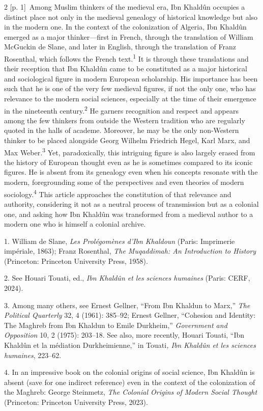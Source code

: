 \documentclass[10pt,a4paper]{article}
\begin{document}
\begin{paracol}{2}
\switchcolumn
{\scriptsize\color{gray} [p. 1]}\ Among Muslim thinkers of the medieval era, Ibn Khaldûn occupies a distinct place not only in the medieval genealogy of historical knowledge but also in the modern one. In the context of the colonization of Algeria, Ibn Khaldûn emerged as a major thinker—first in French, through the translation of William McGuckin de Slane, and later in English, through the translation of Franz Rosenthal, which follows the French text.\nobreak\textsuperscript{1} It is through these translations and their reception that Ibn Khaldûn came to be constituted as a major historical and sociological figure in modern European scholarship. His importance has been such that he is one of the very few medieval figures, if not the only one, who has relevance to the modern social sciences, especially at the time of their emergence in the nineteenth century.\nobreak\textsuperscript{2} He garners recognition and respect and appears among the few thinkers from outside the Western tradition who are regularly quoted in the halls of academe. Moreover, he may be the only non-Western thinker to be placed alongside Georg Wilhelm Friedrich Hegel, Karl Marx, and Max Weber.\nobreak\textsuperscript{3} Yet, paradoxically, this intriguing figure is also largely erased from the history of European thought even as he is sometimes compared to its iconic figures. He is absent from its genealogy even when his concepts resonate with the modern, foregrounding some of the perspectives and even theories of modern sociology.\nobreak\textsuperscript{4} This article approaches the constitution of that relevance and authority, considering it not as a neutral process of transmission but as a colonial one, and asking how Ibn Khaldûn was transformed from a medieval author to a modern one who is himself a colonial archive.\par{\small 1. William de Slane, \textit{Les Prolégomènes d’Ibn Khaldoun} (Paris: Imprimerie impériale, 1863); Franz Rosenthal, \textit{The Muqaddimah: An Introduction to History} (Princeton: Princeton University Press, 1958).\par}{\small 2. See Houari Touati, ed., \textit{Ibn Khaldûn et les sciences humaines} (Paris: CERF, 2024).\par}{\small 3. Among many others, see Ernest Gellner, “From Ibn Khaldun to Marx,” \textit{The Political Quarterly} 32, 4 (1961): 385–92; Ernest Gellner, “Cohesion and Identity: The Maghreb from Ibn Khaldun to Emile Durkheim,” \textit{Government and Opposition} 10, 2 (1975): 203–18. See also, more recently, Houari Touati, “Ibn Khaldûn et la médiation Durkheimienne,” in Touati\textit{, Ibn Khaldûn et les sciences humaines}, 223–62.\par}{\small 4. In an impressive book on the colonial origins of social science, Ibn Khaldûn is absent (save for one indirect reference) even in the context of the colonization of the Maghreb: George Steinmetz, \textit{The Colonial Origins of Modern Social Thought} (Princeton: Princeton University Press, 2023).\par}

\end{paracol}
\end{document}
